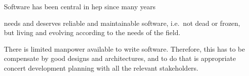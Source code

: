 
Software has been central in \acrlong{hep} since many years

\hep needs and deserves reliable and maintainable software, i.e.\ not dead or
frozen, but living and evolving according to the needs of the field.

There is limited manpower available to write software.
Therefore, this has to be compensate by good designs and architectures, and to
do that is appropriate concert development planning with all the relevant
stakeholders.
